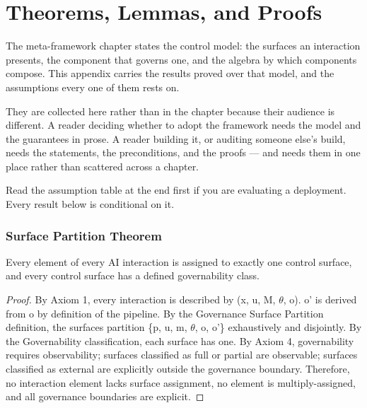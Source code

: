 \chapter{Theorems, Lemmas, and Proofs}
\label{ch:theorems}


The meta-framework chapter states the control model: the surfaces an interaction
presents, the component that governs one, and the algebra by which components
compose. This appendix carries the results proved over that model, and the
assumptions every one of them rests on.

They are collected here rather than in the chapter because their audience is
different. A reader deciding whether to adopt the framework needs the model and
the guarantees in prose. A reader building it, or auditing someone else's build,
needs the statements, the preconditions, and the proofs --- and needs them in one
place rather than scattered across a chapter.

Read the assumption table at the end first if you are evaluating a deployment.
Every result below is conditional on it.

\subsection{Surface Partition Theorem}


\begin{cthm}
Every element of every AI interaction is assigned to exactly one control surface, and every control surface has a defined governability class.

\end{cthm}

\begin{proof}
By Axiom 1, every interaction is described by (x, u, M, $\theta$, o).
o' is derived from o by definition of the pipeline.
By the Governance Surface Partition definition, the surfaces partition \{p, u, m, $\theta$, o, o'\} exhaustively and disjointly.
By the Governability classification, each surface has one.
By Axiom 4, governability requires observability; surfaces classified as full or partial are observable; surfaces classified as external are explicitly outside the governance boundary.
Therefore, no interaction element lacks surface assignment, no element is multiply-assigned, and all governance boundaries are explicit.

\end{proof}







